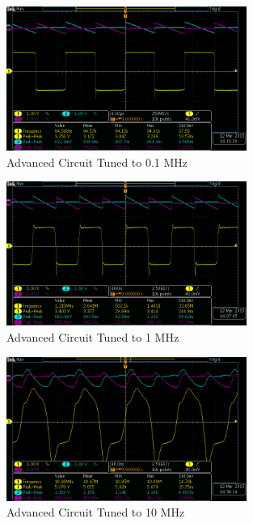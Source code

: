 \documentclass[titlepage, letterpaper, 10.5pt]{article}
\begin{document}
\begin{figure}[ht]
	\centering
	\includegraphics[width=0.7\textwidth]{results/advanced-100kHz}
	\caption{Advanced Circuit Tuned to 0.1 MHz}
	\label{advanced-100kHz}
\end{figure}

\begin{figure}[ht]
	\centering
	\includegraphics[width=0.7\textwidth]{results/advanced-1MHz}
	\caption{Advanced Circuit Tuned to 1 MHz}
	\label{advanced-1MHz}
\end{figure}

\begin{figure}[ht]
	\centering
	\includegraphics[width=0.7\textwidth]{results/advanced-10MHz}
	\caption{Advanced Circuit Tuned to 10 MHz}
	\label{advanced-10MHz}
\end{figure}
\end{document}
